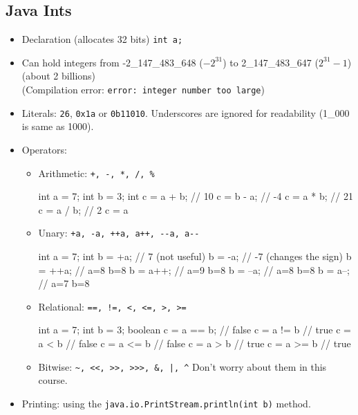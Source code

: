 \documentclass[8pt, a4paper, oneside]{extarticle}
\begin{document}
\subsection{Java Ints}

\begin{itemize}

  \item Declaration (allocates 32 bits) \verb+int a;+

  \item Can hold integers from -2\_147\_483\_648 ($-2^{31}$) to 2\_147\_483\_647
    ($2^{31}-1$) (about 2 billions) \\ (Compilation error: \verb+error: integer number too large+)

  \item Literals: \verb+26+, \verb+0x1a+ or \verb+0b11010+. Underscores are
    ignored for readability (1\_000 is same as 1000).

  \item Operators:

    \begin{itemize}

      \item Arithmetic: \verb^+, -, *, /, %^

\begin{blackboard}
int a = 7;
int b = 3;
int c = a + b; // 10
c = b - a; // -4
c = a * b; // 21
c = a / b; // 2
c = a %
\end{blackboard}

      \item Unary: \verb^+a, -a, ++a, a++, --a, a--^

\begin{blackboard}
int a = 7;
int b = +a; // 7 (not useful)
b = -a; // -7 (changes the sign)
b = ++a; // a=8 b=8
b = a++; // a=9 b=8
b = --a; // a=8 b=8
b = a--; // a=7 b=8
\end{blackboard}

      \item Relational: \verb^==, !=, <, <=, >, >=^

\begin{blackboard}
int a = 7;
int b = 3;
boolean c = a == b; // false
c = a != b // true
c = a < b // false
c = a <= b // false
c = a > b // true
c = a >= b // true
\end{blackboard}

      \item Bitwise: \verb+~, <<, >>, >>>, &, |, ^+ Don't worry about them in
this course.

    \end{itemize}

  \item Printing: using the \verb+java.io.PrintStream.println(int b)+ method.

\end{itemize}
\end{document}
